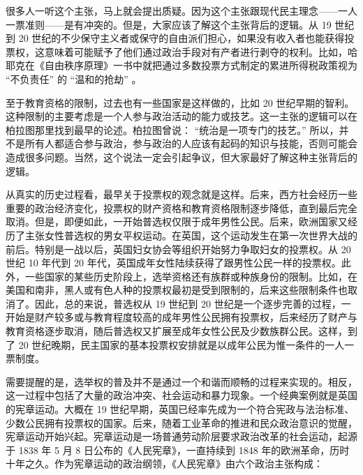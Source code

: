 很多人一听这个主张，马上就会提出质疑。因为这个主张跟现代民主理念——一人一票准则——是有冲突的。但是，大家应该了解这个主张背后的逻辑。从 19 世纪到 20 世纪的不少保守主义者或保守的自由派们担心，如果没有收入者也能获得投票权，这意味着可能赋予了他们通过政治手段对有产者进行剥夺的权利。比如，哈耶克在《自由秩序原理》一书中就把通过多数投票方式制定的累进所得税政策视为 “不负责任” 的 “温和的抢劫” 。

至于教育资格的限制，过去也有一些国家是这样做的，比如 20 世纪早期的智利。这种限制的主要考虑是一个人参与政治活动的能力或技艺。这一主张的逻辑可以在柏拉图那里找到最早的论述。柏拉图曾说： “统治是一项专门的技艺。” 所以，并不是所有人都适合参与政治，参与政治的人应该有起码的知识与技能，否则可能会造成很多问题。当然，这个说法一定会引起争议，但大家最好了解这种主张背后的逻辑。

从真实的历史过程看，最早关于投票权的观念就是这样。后来，西方社会经历一些重要的政治经济变化，投票权的财产资格和教育资格限制逐步降低，直到最后完全取消。但是，即便如此，一开始普选权仅限于成年男性公民。后来，欧洲国家又经历了主张女性普选权的男女平权运动。在英国，这个运动发生在第一次世界大战的前后。特别是一战以后，英国妇女协会等组织开始努力争取妇女的投票权。从 20 世纪 10 年代到 20 年代，英国成年女性陆续获得了跟男性公民一样的投票权。此外，一些国家的某些历史阶段上，选举资格还有族群或种族身份的限制。比如，在美国和南非，黑人或有色人种的投票权最初是受到限制的，后来这些限制条件也取消了。因此，总的来说，普选权从 19 世纪到 20 世纪是一个逐步完善的过程，一开始是财产较多或与教育程度较高的成年男性公民拥有投票权，后来经历了财产与教育资格逐步取消，随后普选权又扩展至成年女性公民及少数族群公民。这样，到了 20 世纪晚期，民主国家的基本投票权安排就是以成年公民为惟一条件的一人一票制度。

需要提醒的是，选举权的普及并不是通过一个和谐而顺畅的过程来实现的。相反，这一过程中包括了大量的政治冲突、社会运动和暴力现象。一个经典案例就是英国的宪章运动。大概在 19 世纪早期，英国已经率先成为一个符合宪政与法治标准、少数公民拥有投票权的国家。后来，随着工业革命的推进和民众政治意识的觉醒，宪章运动开始兴起。宪章运动是一场普通劳动阶层要求政治改革的社会运动，起源于 1838 年 5 月 8 日公布的《人民宪章》，一直持续到 1848 年的欧洲革命，历时十年之久。作为宪章运动的政治纲领，《人民宪章》由六个政治主张构成：


